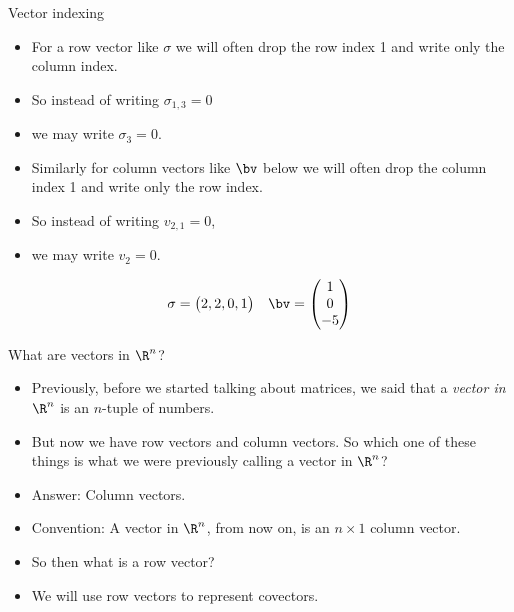 \documentclass{beamer}
\begin{document}

\begin{frame}{Vector indexing}

\begin{itemize}
\item For a row vector like $\sigma$ we will often drop the row
index 1 and write only the column index.
\item So instead of writing $\sigma_{1,3} = 0$
\item we may write $\sigma_3 = 0$.
\item Similarly for column vectors like $\bv$ below we will often
drop the column index 1 and write only the row index.
\item So instead of writing $v_{2,1} = 0$,
\item we may write $v_2 = 0$.
\end{itemize}

$$
\begin{matrix}
\sigma =
\begin{pmatrix}
2, 2, 0, 1
\end{pmatrix}

&

\bv =
\begin{pmatrix}
1 \\
0 \\
-5
\end{pmatrix}
\end{matrix}
$$

\end{frame}


\begin{frame}{What are vectors in $\R^n$?}

\begin{itemize}
\item Previously, before we started talking about matrices, we said that
a \emph{vector in $\R^n$} is an $n$-tuple of numbers.
\item But now we have row vectors and column vectors. So which one of these
things is what we were previously calling a vector in $\R^n$?
\item Answer: Column vectors.
\item Convention: A vector in $\R^n$, from now on, is an $n\times 1$
column vector.
\item So then what is a row vector?
\item We will use row vectors to represent covectors.
\end{itemize}

\end{frame}
\end{document}
